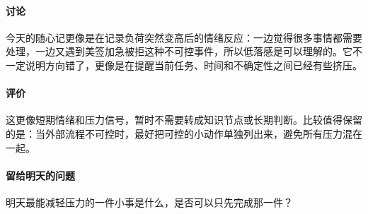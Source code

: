 \documentclass[UTF8,zihao=-4]{ctexart}
\begin{document}
\paragraph{讨论} 今天的随心记更像是在记录负荷突然变高后的情绪反应：一边觉得很多事情都需要处理，一边又遇到美签加急被拒这种不可控事件，所以低落感是可以理解的。它不一定说明方向错了，更像是在提醒当前任务、时间和不确定性之间已经有些挤压。
\paragraph{评价} 这更像短期情绪和压力信号，暂时不需要转成知识节点或长期判断。比较值得保留的是：当外部流程不可控时，最好把可控的小动作单独列出来，避免所有压力混在一起。
\paragraph{留给明天的问题} 明天最能减轻压力的一件小事是什么，是否可以只先完成那一件？
\end{document}
